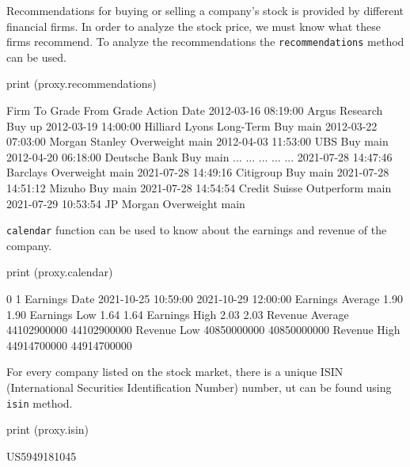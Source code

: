 Recommendations for buying or selling a company’s stock is provided by different financial firms. In order to analyze the stock price, we must know what these firms recommend. To analyze the recommendations the \texttt{recommendations} method can be used.

\begin{ipython}
print (proxy.recommendations)
\end{ipython}
\begin{ioutput}
                               Firm       To Grade From Grade Action
Date                                                                
2012-03-16 08:19:00  Argus Research            Buy                up
2012-03-19 14:00:00  Hilliard Lyons  Long-Term Buy              main
2012-03-22 07:03:00  Morgan Stanley     Overweight              main
2012-04-03 11:53:00             UBS            Buy              main
2012-04-20 06:18:00   Deutsche Bank            Buy              main
...                             ...            ...        ...    ...
2021-07-28 14:47:46        Barclays     Overweight              main
2021-07-28 14:49:16       Citigroup            Buy              main
2021-07-28 14:51:12          Mizuho            Buy              main
2021-07-28 14:54:54   Credit Suisse     Outperform              main
2021-07-29 10:53:54       JP Morgan     Overweight              main
\end{ioutput}

\texttt{calendar} function can be used to know about the earnings and revenue of the company.

\begin{ipython}
print (proxy.calendar)
\end{ipython}
\begin{ioutput}
                                    0                    1
Earnings Date     2021-10-25 10:59:00  2021-10-29 12:00:00
Earnings Average                 1.90                 1.90
Earnings Low                     1.64                 1.64
Earnings High                    2.03                 2.03
Revenue Average           44102900000          44102900000
Revenue Low               40850000000          40850000000
Revenue High              44914700000          44914700000
\end{ioutput}

For every company listed on the stock market, there is a unique ISIN (International Securities Identification Number) number, ut can be found using \texttt{isin} method.

\begin{ipython}
print (proxy.isin)
\end{ipython}
\begin{ioutput}
US5949181045
\end{ioutput}

